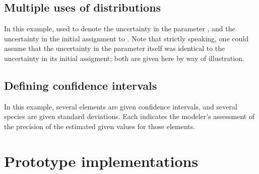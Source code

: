 \documentclass[draftspec]{sbmlpkgspec}
\newcommand{\Distribution}{\defRef{Distribution}{Distribution-class}}
\begin{document}


\subsection{Multiple uses of distributions }

In this example,  used to denote the uncertainty in the parameter , and the uncertainty in the initial assignment to .  Note that strictly speaking, one could assume that the uncertainty in the parameter itself was identical to the uncertainty in its initial assigment; both are given here by way of illustration.



\subsection{Defining confidence intervals }

In this example, several \Parameter elements are given confidence intervals, and several species are given standard deviations.  Each indicates the modeler's assessment of the precision of the estimated given values for those elements.  







\section{Prototype implementations}

\end{document}
